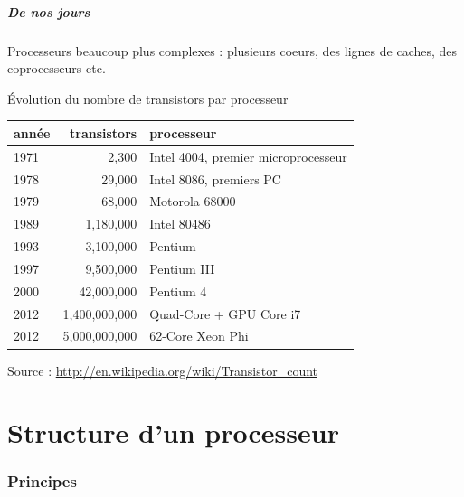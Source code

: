 \begin{frame}
  \frametitle{De nos jours}
Processeurs beaucoup plus complexes :
plusieurs coeurs,  des lignes de caches,  des coprocesseurs etc.

\alert{Évolution du nombre de transistors par processeur}
\begin{center}
\begin{tabular}{|l|r|l|}
\hline
année &  transistors & processeur\\
\hline
1971 & 2,300 & Intel 4004, premier microprocesseur \\
1978 & 29,000 & Intel 8086, premiers PC \\
1979 & 68,000 & Motorola 68000 \\
1989 &	1,180,000 & Intel 80486 \\
1993 & 	3,100,000 & Pentium \\
1997 & 	9,500,000  & Pentium III \\
2000 & 42,000,000 & Pentium 4 \\
2012 & 1,400,000,000 & Quad-Core + GPU Core i7 \\
2012 & 5,000,000,000  & 62-Core Xeon Phi \\
\hline
\end{tabular}
\end{center}

Source : \url{http://en.wikipedia.org/wiki/Transistor_count}
\end{frame}


\part{Structure d'un processeur}

\section{Principes}

